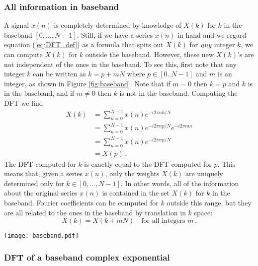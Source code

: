 \documentclass[twocolumn]{article}
\begin{document}
\subsubsection{All information in baseband}

A signal $x(n)$ is completely determined by knowledge of $X(k)$ for $k$ in the baseband $[0,\ldots,N-1]$.
Still, if we have a series $x(n)$ in hand and we regard equation (\ref{eq:DFT_def}) as a formula that spits out $X(k)$ for $\emph{any}$ integer $k$, we can compute $X(k)$ for $k$ outside the baseband.
However, these new $X(k)$'s are not independent of the ones in the baseband.
To see this, first note that any integer $k$ can be written as $k=p+mN$ where $p \in [0..N-1]$ and $m$ is an integer, as shown in Figure \ref{fig:baseband}.
Note that if $m=0$ then $k=p$ and $k$ is in the baseband, and if $m \neq 0$ then $k$ is not in the baseband.
Computing the DFT we find
\begin{align}
X(k) &= \sum_{n=0}^{N-1} x(n) e^{-i2\pi nk/N}\\
&= \sum_{n=0}^{N-1} x(n) e^{-i2\pi np/N} e^{-i2\pi nm} \\
&= \sum_{n=0}^{N-1} x(n)e^{-i2\pi np/N} \\
&= X(p) \, .
\end{align}
The DFT computed for $k$ is exactly equal to the DFT computed for $p$.
This means that, given a series $x(n)$, only the weights $X(k)$ are uniquely determined only for $k \in [0, \ldots , N-1]$.
In other words, all of the information about the original series $x(n)$ is contained in the set $X(k)$ for $k$ in the baseband.
Fourier coefficients can be computed for $k$ outside this range, but they are all related to the ones in the baseband by translation in $k$ space:
\begin{equation}
X(k) = X(k+mN) \quad \textrm{for all integers }m \, . \label{eq:translational_symmetry}
\end{equation}

\begin{figure*}[t]
\begin{centering}
\texttt{[image: baseband.pdf]}
\par\end{centering}
\caption{Illustration of the baseband and higher bands.}
\label{fig:baseband}
\end{figure*}


\subsubsection{DFT of a baseband complex exponential}
\end{document}
